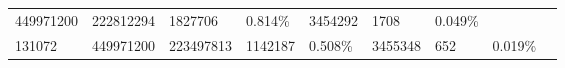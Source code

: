 \documentclass[11pt]{article}
\begin{document}
\begin{longtable}[]{@{}lllllllll@{}}
\begin{minipage}[t]{0.09\columnwidth}
449971200\strut
\end{minipage} & \begin{minipage}[t]{0.07\columnwidth}\raggedright\strut
222812294\strut
\end{minipage} & \begin{minipage}[t]{0.08\columnwidth}\raggedright\strut
1827706\strut
\end{minipage} & \begin{minipage}[t]{0.08\columnwidth}\raggedright\strut
0.814\%\strut
\end{minipage} & \begin{minipage}[t]{0.08\columnwidth}\raggedright\strut
3454292\strut
\end{minipage} & \begin{minipage}[t]{0.09\columnwidth}\raggedright\strut
1708\strut
\end{minipage} & \begin{minipage}[t]{0.09\columnwidth}\raggedright\strut
0.049\%\strut
\end{minipage} & \begin{minipage}[t]{0.06\columnwidth}\raggedright\strut
\strut
\end{minipage}\tabularnewline
\begin{minipage}[t]{0.12\columnwidth}\raggedright\strut
131072\strut
\end{minipage} & \begin{minipage}[t]{0.09\columnwidth}\raggedright\strut
449971200\strut
\end{minipage} & \begin{minipage}[t]{0.07\columnwidth}\raggedright\strut
223497813\strut
\end{minipage} & \begin{minipage}[t]{0.08\columnwidth}\raggedright\strut
1142187\strut
\end{minipage} & \begin{minipage}[t]{0.08\columnwidth}\raggedright\strut
0.508\%\strut
\end{minipage} & \begin{minipage}[t]{0.08\columnwidth}\raggedright\strut
3455348\strut
\end{minipage} & \begin{minipage}[t]{0.09\columnwidth}\raggedright\strut
652\strut
\end{minipage} & \begin{minipage}[t]{0.09\columnwidth}\raggedright\strut
0.019\%\strut
\end{minipage} & \begin{minipage}[t]{0.06\columnwidth}\raggedright\strut

\end{minipage}
\end{longtable}
\end{document}
